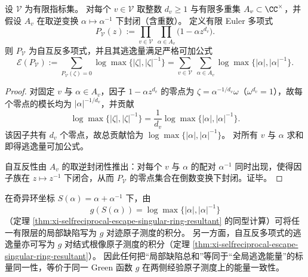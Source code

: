 \begin{corollary}\label{cor:xi-finite-euler-polynomial-escape-additivity}
设 \(\mathcal{V}\) 为有限指标集。
对每个 \(v\in\mathcal{V}\) 取整数 \(d_v\ge 1\) 与有限多重集 \(A_v\subset\CC^\times\)，并假设 \(A_v\) 在取逆变换 \(\alpha\mapsto \alpha^{-1}\) 下封闭（含重数）。
定义有限 Euler 多项式
\[
P_{\mathcal{V}}(z):=\prod_{v\in\mathcal{V}}\ \prod_{\alpha\in A_v}\bigl(1-\alpha z^{d_v}\bigr).
\]
则 \(P_{\mathcal{V}}\) 为自互反多项式，并且其逃逸量满足严格可加公式
\[
\mathcal{E}(P_{\mathcal{V}})
:=\sum_{P_{\mathcal{V}}(\zeta)=0}\log\max\{|\zeta|,|\zeta|^{-1}\}
=\sum_{v\in\mathcal{V}}\ \sum_{\alpha\in A_v}\log\max\{|\alpha|,|\alpha|^{-1}\}.
\]
\end{corollary}
\begin{proof}
对固定 \(v\) 与 \(\alpha\in A_v\)，因子 \(1-\alpha z^{d_v}\) 的零点为
\(\zeta=\alpha^{-1/d_v}\omega\)（\(\omega^{d_v}=1\)），故每个零点的模长均为 \(|\alpha|^{-1/d_v}\)，并贡献
\[
\log\max\{|\zeta|,|\zeta|^{-1}\}=\frac{1}{d_v}\log\max\{|\alpha|,|\alpha|^{-1}\}.
\]
该因子共有 \(d_v\) 个零点，故总贡献恰为 \(\log\max\{|\alpha|,|\alpha|^{-1}\}\)。
对所有 \(v\) 与 \(\alpha\) 求和即得逃逸量可加公式。
\par
自互反性由 \(A_v\) 的取逆封闭性推出：对每个 \(v\) 与 \(\alpha\) 的配对 \(\alpha^{-1}\) 同时出现，使得因子族在 \(z\mapsto z^{-1}\) 下闭合，从而 \(P_{\mathcal{V}}\) 的零点集合在倒数变换下封闭。证毕。
\end{proof}

\begin{remark}\label{rem:xi-scalar-defect-green-energy-synonymy}
在奇异环坐标 \(S(\alpha)=\alpha+\alpha^{-1}\) 下，由
\[
g(S(\alpha))=\log\max\{|\alpha|,|\alpha|^{-1}\}
\]
（定理 \ref{thm:xi-selfreciprocal-escape-singular-ring-resultant} 的同型计算）可将任一有限层的局部缺陷写为 \(g\) 对迹原子测度的积分。
另一方面，自互反多项式的逃逸量亦可写为 \(g\) 对结式根像原子测度的积分（定理 \ref{thm:xi-selfreciprocal-escape-singular-ring-resultant}）。
因此任何把“局部缺陷总和”等同于“全局逃逸能量”的标量同一性，等价于同一 Green 函数 \(g\) 在两侧经验原子测度上的能量一致性。
\end{remark}

\endinput
